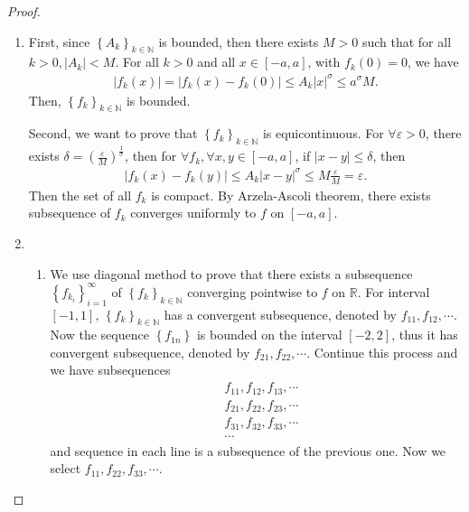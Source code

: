 \documentclass[11pt]{article}
\theoremstyle{definition}
\numberwithin{equation}{subsection}
\begin{document}
\begin{proof}
~\begin{enumerate}[label=(\alph*)]
    \item First, since $\left\{A_k\right\}_{k\in \mathbb{N}}$ is bounded, then there exists $M > 0$ such that for all $k > 0, \left|A_k\right| < M$. For all $k > 0$ and all $x\in [-a,a]$, with $f_k(0) = 0$, we have
    \begin{align*}
        \left|f_k(x)\right| = \left|f_k(x) - f_k(0)\right| \leq A_k |x|^\sigma \leq a^\sigma M.
    \end{align*}
    Then, $\left\{f_k\right\}_{k\in \mathbb{N}}$ is bounded.
    
    Second, we want to prove that $\left\{f_k\right\}_{k\in \mathbb{N}}$ is equicontinuous. For $\forall \varepsilon > 0$, there exists $\delta = \left(\frac{\varepsilon}{M}\right)^{\frac{1}{\sigma}}$, then for $\forall f_k, \forall x, y \in [-a,a]$, if $|x - y| \leq \delta$, then 
    \begin{align*}
        \left|f_k(x) - f_k(y)\right| \leq A_k |x - y|^\sigma \leq M \frac{\varepsilon}{M} = \varepsilon.
    \end{align*}
    Then the set of all $f_k$ is compact. By Arzela-Ascoli theorem, there exists subsequence of $f_k$ converges uniformly to $f$ on $[-a,a]$.
    
    \item 
    \begin{enumerate}[label = \arabic*)]
        \item We use diagonal method to prove that there exists a subsequence $\left\{f_{k_i}\right\}^\infty_{i=1}$ of $\left\{f_k\right\}_{k\in \mathbb{N}}$ converging pointwise to $f$ on $\mathbb{R}$. For interval $[-1,1]$, $\left\{f_k\right\}_{k\in \mathbb{N}}$ has a convergent subsequence, denoted by $f_{11}, f_{12}, \cdots$. Now the sequence $\left\{f_{1n}\right\}$ is bounded on the interval $[-2,2]$, thus it has convergent subsequence, denoted by $f_{21}, f_{22}, \cdots$. Continue this process and we have subsequences
        \begin{align*}
            & f_{11}, f_{12}, f_{13}, \cdots \\
            & f_{21}, f_{22}, f_{23}, \cdots \\
            & f_{31}, f_{32}, f_{33}, \cdots \\
            & \cdots 
        \end{align*}
        and sequence in each line is a subsequence of the previous one. Now we select $f_{11}, f_{22}, f_{33}, \cdots$. 
    

\end{enumerate}
\end{enumerate}
\end{proof}
\end{document}
